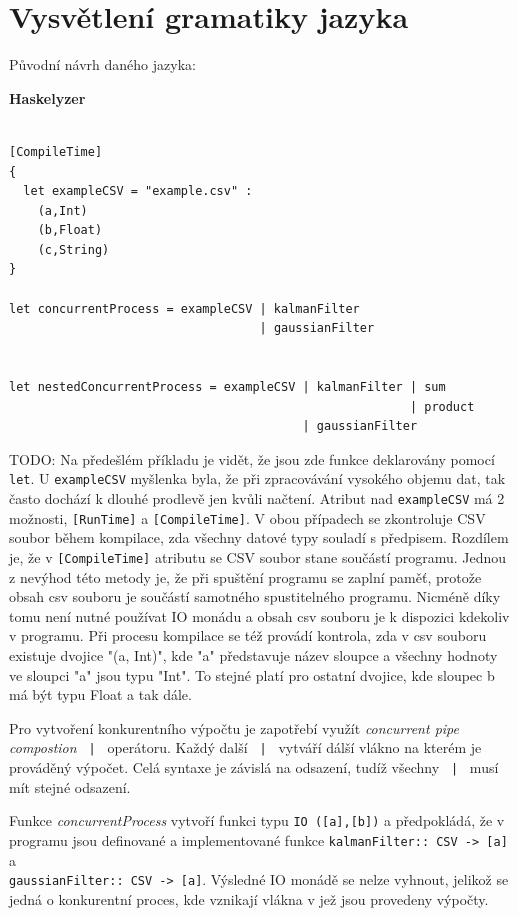 \documentclass[male,czech]{kithesis}
\newcommand{\haskellInline}[1]{\colorbox{gray!10}{\texttt{#1}}}
\begin{document}
\section{Vysvětlení gramatiky jazyka}


\setlength{\parindent}{0pt}
Původní návrh daného jazyka:

\textbf{Haskelyzer}
\begin{verbatim}

[CompileTime]
{
  let exampleCSV = "example.csv" :
    (a,Int)
    (b,Float)
    (c,String)
}

let concurrentProcess = exampleCSV | kalmanFilter 
                                   | gaussianFilter 
                                      

let nestedConcurrentProcess = exampleCSV | kalmanFilter | sum
                                                        | product
                                         | gaussianFilter

\end{verbatim}

TODO:
Na předešlém příkladu je vidět,
že jsou zde funkce deklarovány pomocí \haskellInline{let}.
U \haskellInline{exampleCSV} myšlenka byla, 
že při zpracovávání vysokého objemu dat,
tak často dochází k dlouhé prodlevě jen kvůli načtení.
Atribut nad \haskellInline{exampleCSV} 
má 2 možnosti, 
\haskellInline{[RunTime]} a \haskellInline{[CompileTime]}.
V obou případech se
zkontroluje CSV soubor během kompilace, 
zda všechny datové typy souladí s předpisem.
Rozdílem je, 
že v \haskellInline{[CompileTime]} atributu se CSV soubor
stane součástí programu. 
Jednou z nevýhod této metody je, 
že při spuštění programu se zaplní paměť, 
protože obsah csv souboru je součástí samotného spustitelného programu.
Nicméně díky tomu není nutné používat IO monádu a 
obsah csv souboru je k dispozici kdekoliv v programu.
Při procesu kompilace se též provádí kontrola, 
zda v csv souboru existuje dvojice "(a, Int)", 
kde "a" představuje název sloupce a 
všechny hodnoty ve sloupci "a" jsou typu "Int".
To stejné platí pro ostatní dvojice, 
kde sloupec b má být typu Float a tak dále.

Pro vytvoření konkurentního výpočtu je zapotřebí využít \textit{concurrent pipe compostion}
\haskellInline{ | } operátoru. 
Každý další \haskellInline{ | } vytváří dálší vlákno na kterém je prováděný výpočet.
Celá syntaxe je závislá na odsazení, 
tudíž všechny \haskellInline{ | } musí mít stejné odsazení.

Funkce \textit{concurrentProcess} vytvoří funkci typu \haskellInline{IO ([a],[b])} a 
předpokládá, 
že v programu jsou definované a implementované funkce
\haskellInline{kalmanFilter:: CSV -> [a]} a \\
\haskellInline{gaussianFilter:: CSV -> [a]}. 
Výsledné IO monádě se nelze vyhnout, 
jelikož se jedná o konkurentní proces, 
kde vznikají vlákna v jež jsou provedeny výpočty. 
\end{document}
